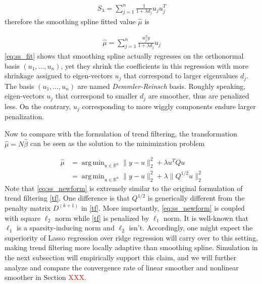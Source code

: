 \documentclass[a4paper]{article}
\DeclareMathOperator*{\argmin}{arg\,min}
\newcommand{\RR}{\mathbb{R}}
\begin{document}
\begin{align*}
S_\lambda = \sum_{j=1}^n \frac{1}{1+\lambda d_j}u_ju_j^T
\end{align*}
therefore the smoothing spline fitted value $\hat{\mu}$ is 

\begin{align}
\hat{\mu} = \sum_{j=1}^n \frac{u_j^Ty}{1+\lambda d_j}u_j
\label{eq:ss_fit}
\end{align}
\eqref{eq:ss_fit} shows that smoothing spline actually regresses on the orthonormal basis $(u_1,\ldots, u_n)$, yet they shrink the coefficients in this regression with more shrinkage assigned to eigen-vectors $u_j$ that correspond to larger eigenvalues $d_j$. The basis $(u_1,\ldots, u_n)$ are named \textit{Demmler-Reinsch} basis\cite{demmler1975oscillation}. Roughly speaking, eigen-vectors $u_j$ that correspond to smaller $d_j$ are smoother, thus are penalized less. On the contrary, $u_j$ corresponding to more wiggly components endure larger penalization. 

Now to compare with the formulation of trend filtering, the transformation $\hat{\mu} = N\hat{\beta}$ can be seen as the solution to the minimization problem

\begin{equation}
\begin{aligned}
\hat{\mu} &= \argmin_{u\in\RR^n} \|y-u\|_2^2 + \lambda u^TQu\\
&= \argmin_{u\in\RR^n} \|y-u\|_2^2 + \lambda\|Q^{1/2}u\|_2^2
\label{eq:ss_newform}
\end{aligned}
\end{equation}
Note that \eqref{eq:ss_newform} is extremely similar to the original formulation of trend filtering \eqref{tf}. One difference is that $Q^{1/2}$ is generically different from the penalty matrix $D^{(k+1)}$ in \eqref{tf}. More importantly, \eqref{eq:ss_newform} is coupled with square $\ell_2$ norm while \eqref{tf} is penalized by $\ell_1$ norm. It is well-known that $\ell_1$ is a sparsity-inducing norm and $\ell_2$ isn't. Accordingly, one might expect the superiority of Lasso regression over ridge regression will carry over to this setting, making trend filtering more locally adaptive than smoothing spline. Simulation in the next subsection will empirically support this claim, and we will further analyze and compare the convergence rate of linear smoother and nonlinear smoother in Section \textcolor{red}{XXX}.
\end{document}
